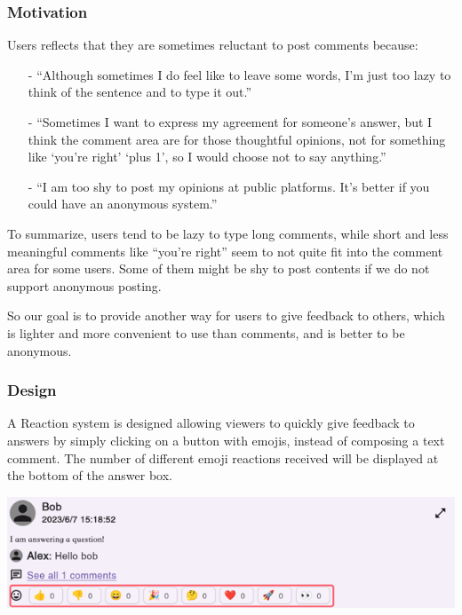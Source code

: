 \documentclass[a4paper]{article}
\begin{document}
    \subsubsection*{Motivation}
    Users reflects that they are sometimes reluctant to post comments because:
    \begin{itemize}
        \item[-] ``Although sometimes I do feel like to leave some words, I'm just too lazy to think of the sentence and to type it out.''
        \item[-] ``Sometimes I want to express my agreement for someone's answer, but I think the comment area are for those thoughtful opinions,
                 not for something like `you're right' `plus 1', so I would choose not to say anything.''
        \item[-] ``I am too shy to post my opinions at public platforms.
                   It's better if you could have an anonymous system.''
    \end{itemize}
    To summarize, users tend to be lazy to type long comments, while short and less meaningful comments like ``you're right'' seem to not quite fit into the comment area for some users.
    Some of them might be shy to post contents if we do not support anonymous posting.

    So our goal is to provide another way for users to give feedback to others, which is lighter and more convenient to use than comments, and is better to be anonymous.

    \subsubsection*{Design}
    A Reaction system is designed allowing viewers to quickly give feedback to answers by simply clicking on a button with emojis, instead of composing a text comment.
    The number of different emoji reactions received will be displayed at the bottom of the answer box.

    \includegraphics{reaction}
\end{document}
